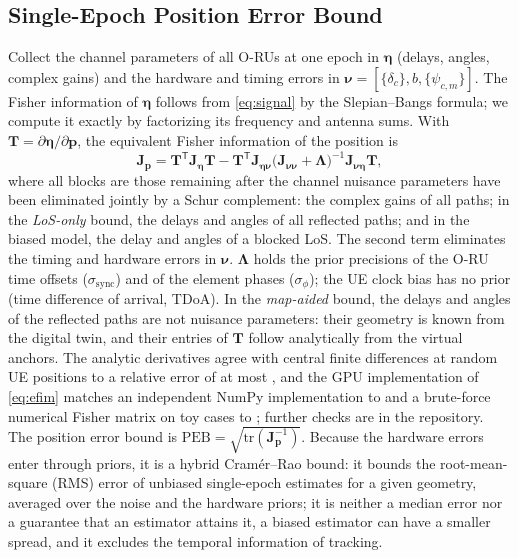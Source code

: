 \documentclass[conference]{IEEEtran}
\begin{document}
\subsection{Single-Epoch Position Error Bound}
Collect the channel parameters of all O-RUs at one epoch in
$\boldsymbol\eta$ (delays, angles, complex gains) and the hardware and
timing errors in $\boldsymbol\nu=[\{\delta_c\},b,\{\psi_{c,m}\}]$. The
Fisher information of $\boldsymbol\eta$ follows from \eqref{eq:signal}
by the Slepian--Bangs formula; we compute it exactly by factorizing its
frequency and antenna sums. With $\mathbf T=\partial\boldsymbol\eta/\partial\mathbf p$,
the equivalent Fisher information of the position is
\begin{equation}
\mathbf J_{\mathbf p}=\mathbf T^{\mathsf T}\mathbf J_{\boldsymbol\eta}\mathbf T
-\mathbf T^{\mathsf T}\mathbf J_{\boldsymbol\eta\boldsymbol\nu}
\bigl(\mathbf J_{\boldsymbol\nu\boldsymbol\nu}+\boldsymbol\Lambda\bigr)^{-1}
\mathbf J_{\boldsymbol\nu\boldsymbol\eta}\mathbf T,
\label{eq:efim}
\end{equation}
where all blocks are those remaining after the channel nuisance
parameters have been eliminated jointly by a Schur complement: the
complex gains of all paths; in the \emph{LoS-only} bound, the delays and
angles of all reflected paths; and in the biased model, the delay and
angles of a blocked LoS. The second term eliminates the timing and
hardware errors in $\boldsymbol\nu$. $\boldsymbol\Lambda$ holds the prior precisions of the
O-RU time offsets ($\sigma_{\mathrm{sync}}$) and of the element phases
($\sigma_\phi$); the UE clock bias has no prior (time difference of
arrival, TDoA). In the \emph{map-aided} bound, the delays and angles of the reflected
paths are not nuisance parameters: their geometry is known from the digital twin,
and their entries of $\mathbf T$ follow analytically from the virtual
anchors. The analytic derivatives agree with central finite differences
at \pDerivFdNumUe{} random UE positions to a relative error of at most
\pDerivFdMaxRel, and the GPU implementation of \eqref{eq:efim} matches
an independent NumPy implementation to \pFimJobErr{} and a brute-force
numerical Fisher matrix on toy cases to \pFimToyErr; further checks are
in the repository. The position
error bound is $\mathrm{PEB}=\sqrt{\mathrm{tr}(\mathbf J_{\mathbf p}^{-1})}$.
Because the hardware errors enter through priors, it is a hybrid
Cram\'er--Rao bound: it bounds the root-mean-square (RMS) error of
unbiased single-epoch estimates for a given geometry, averaged over the
noise and the hardware priors; it is neither a median error nor a
guarantee that an estimator attains it, a biased estimator can have a
smaller spread, and it excludes the temporal information of
tracking.
\end{document}
